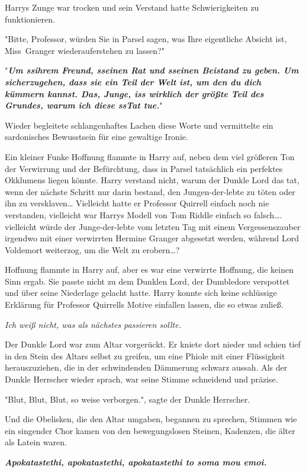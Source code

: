 {Harrys Zunge war trocken und sein Verstand hatte Schwierigkeiten zu funktionieren.

"Bitte, Professor, würden Sie in Parsel sagen, was Ihre eigentliche Absicht ist, Miss~Granger wiederauferstehen zu lassen?"

"\textbf{\emph{Um ssihrem Freund, sseinen Rat und sseinen Beistand zu geben. Um sicherzugehen, dass sie ein Teil der Welt ist, um den du dich kümmern kannst. Das, Junge, iss wirklich der größte Teil des Grundes, warum ich diese ssTat tue.}}"

Wieder begleitete schlangenhaftes Lachen diese Worte und vermittelte ein sardonisches Bewusstsein für eine gewaltige Ironie.

Ein kleiner Funke Hoffnung flammte in Harry auf, neben dem viel größeren Ton der Verwirrung und der Befürchtung, dass in Parsel tatsächlich ein perfektes Okklumens liegen könnte. Harry verstand nicht, warum der Dunkle Lord das tat, wenn der nächste Schritt nur darin bestand, den Jungen-der-lebte zu töten oder ihn zu versklaven… Vielleicht hatte er Professor Quirrell einfach noch nie verstanden, vielleicht war Harrys Modell von Tom Riddle einfach so falsch…. vielleicht würde der Junge-der-lebte vom letzten Tag mit einem Vergessenszauber irgendwo mit einer verwirrten Hermine Granger abgesetzt werden, während Lord Voldemort weiterzog, um die Welt zu erobern…?

Hoffnung flammte in Harry auf, aber es war eine verwirrte Hoffnung, die keinen Sinn ergab. Sie passte nicht zu dem Dunklen Lord, der Dumbledore verspottet und über seine Niederlage gelacht hatte. Harry konnte sich keine schlüssige Erklärung für Professor Quirrells Motive einfallen lassen, die so etwas zuließ.

\emph{Ich weiß nicht, was als nächstes passieren sollte.}

Der Dunkle Lord war zum Altar vorgerückt. Er kniete dort nieder und schien tief in den Stein des Altars selbst zu greifen, um eine Phiole mit einer Flüssigkeit herauszuziehen, die in der schwindenden Dämmerung schwarz aussah. Als der Dunkle Herrscher wieder sprach, war seine Stimme schneidend und präzise.

"Blut, Blut, Blut, so weise verborgen.", sagte der Dunkle Herrscher.

Und die Obelisken, die den Altar umgaben, begannen zu sprechen, Stimmen wie ein singender Chor kamen von den bewegungslosen Steinen, Kadenzen, die älter als Latein waren.

\textbf{\emph{\hfill\break Apokatastethi, apokatastethi, apokatastethi to soma mou emoi.}}

}
